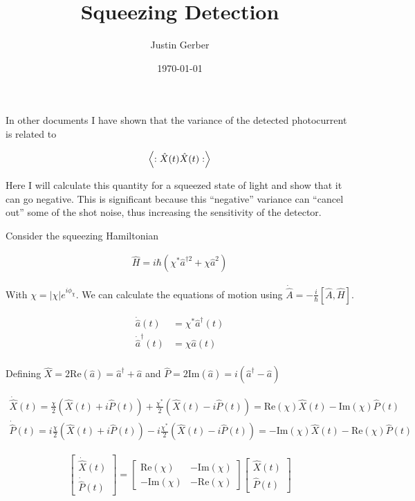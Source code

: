 \documentclass[12pt]{article}
\begin{document}
\title{Squeezing Detection}
\author{Justin Gerber}
\date{\today}
\maketitle

In other documents I have shown that the variance of the detected photocurrent is related to

\begin{align}
\Braket{:\hat{X}(t)\hat{X}(t):}
\end{align}

Here I will calculate this quantity for a squeezed state of light and show that it can go negative. This is significant because this ``negative'' variance can ``cancel out'' some of the shot noise, thus increasing the sensitivity of the detector.

Consider the squeezing Hamiltonian

\begin{align}
\hat{H} = i \hbar (\chi^* \hat{a}^{\dag2} + \chi{\hat{a}}^2)
\end{align}

With $\chi = |\chi|e^{i \phi_{\chi}}$. We can calculate the equations of motion using $\dot{\hat{A}} = -\frac{i}{\hbar} \left[\hat{A},\hat{H}\right]$.

\begin{align}
\dot{\hat{a}}(t) &= \chi^* \hat{a}^{\dag}(t)\\
\dot{\hat{a}}^{\dag}(t) &= \chi \hat{a}(t)\\
\end{align}

Defining $\hat{X} = 2\text{Re}(\hat{a}) = \hat{a}^{\dag} + \hat{a}$ and $\hat{P} = 2\text{Im}(\hat{a}) = i(\hat{a}^{\dag} - \hat{a})$

\begin{align}
\dot{\hat{X}}(t) = \frac{\chi}{2}(\hat{X}(t) + i \hat{P}(t)) + \frac{\chi^*}{2}(\hat{X}(t) - i \hat{P}(t)) = \text{Re}(\chi)\hat{X}(t) - \text{Im}(\chi)\hat{P}(t)\\
\dot{\hat{P}}(t) = i\frac{\chi}{2}(\hat{X}(t) + i \hat{P}(t)) -i\frac{\chi^*}{2}(\hat{X}(t) - i \hat{P}(t)) = -\text{Im}(\chi) \hat{X}(t) - \text{Re}(\chi)\hat{P}(t)
\end{align}

\begin{align}
\begin{bmatrix}
\dot{\hat{X}}(t)\\
\dot{\hat{P}}(t)
\end{bmatrix}
=
\begin{bmatrix}
\text{Re}(\chi) & -\text{Im}(\chi)\\
-\text{Im}(\chi) & -\text{Re}(\chi)
\end{bmatrix}
\begin{bmatrix}
\hat{X}(t)\\
\hat{P}(t)
\end{bmatrix}
\end{align}
\end{document}

